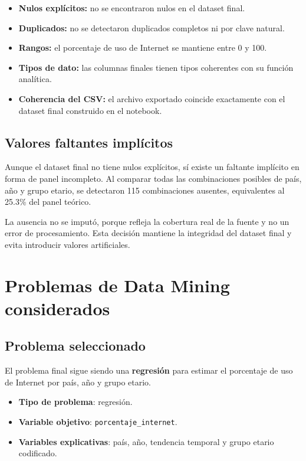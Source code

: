 \documentclass[12pt,a4paper]{article}
\begin{document}
\begin{itemize}
    \item \textbf{Nulos explícitos:} no se encontraron nulos en el dataset final.
    \item \textbf{Duplicados:} no se detectaron duplicados completos ni por clave natural.
    \item \textbf{Rangos:} el porcentaje de uso de Internet se mantiene entre 0 y 100.
    \item \textbf{Tipos de dato:} las columnas finales tienen tipos coherentes con su función analítica.
    \item \textbf{Coherencia del CSV:} el archivo exportado coincide exactamente con el dataset final construido en el notebook.
\end{itemize}

\subsection{Valores faltantes implícitos}

Aunque el dataset final no tiene nulos explícitos, sí existe un faltante implícito en forma de panel incompleto. Al comparar todas las combinaciones posibles de país, año y grupo etario, se detectaron 115 combinaciones ausentes, equivalentes al 25.3\% del panel teórico.

La ausencia no se imputó, porque refleja la cobertura real de la fuente y no un error de procesamiento. Esta decisión mantiene la integridad del dataset final y evita introducir valores artificiales.

\section{Problemas de Data Mining considerados}

\subsection{Problema seleccionado}

El problema final sigue siendo una \textbf{regresión} para estimar el porcentaje de uso de Internet por país, año y grupo etario.

\begin{itemize}
    \item \textbf{Tipo de problema}: regresión.
    \item \textbf{Variable objetivo}: \texttt{porcentaje\_internet}.
    \item \textbf{Variables explicativas}: país, año, tendencia temporal y grupo etario codificado.
\end{itemize}
\end{document}
